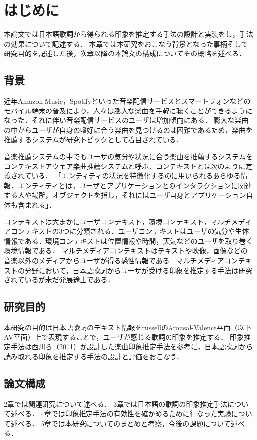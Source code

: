 \documentclass[a4paper,11pt,oneside,openany]{jsbook}
\begin{document}
\chapter{はじめに}
本論文では日本語歌詞から得られる印象を推定する手法の設計と実装をし，手法の効果について記述する．
本章では本研究をおこなう背景となった事柄そして研究目的を記述した後，次章以降の本論文の構成についてその概略を述べる．

\section{背景}
近年Amazon Music，Spotifyといった音楽配信サービスとスマートフォンなどのモバイル端末の普及により，人々は膨大な楽曲を手軽に聴くことができるようになった．それに伴い音楽配信サービスのユーザは増加傾向にある\cite{1}．
膨大な楽曲の中からユーザが自身の嗜好に合う楽曲を見つけるのは困難であるため，楽曲を推薦するシステムが研究トピックとして着目されている．

音楽推薦システムの中でもユーザの気分や状況に合う楽曲を推薦するシステムをコンテキストアウェア楽曲推薦システムと呼ぶ．コンテキストとは次のように定義されている．
「エンティティの状況を特徴化するのに用いられるあらゆる情報．エンティティとは，ユーザとアプリケーションとのインタラクションに関連する人や場所，オブジェクトを指し，それにはユーザ自身とアプリケーション自体も含まれる」\cite{2}．

コンテキストは大まかにユーザコンテキスト，環境コンテキスト，マルチメディアコンテキストの3つに分類される．ユーザコンテキストはユーザの気分や生体情報である．環境コンテキストは位置情報や時間，天気などのユーザを取り巻く環境情報である．
マルチメディアコンテキストはテキストや映像，画像などの音楽以外のメディアからユーザが得る感性情報である．マルチメディアコンテキストの分野において，日本語歌詞からユーザが受ける印象を推定する手法は研究されているが未だ発展途上である．
\section{研究目的}
本研究の目的は日本語歌詞のテキスト情報をrussellのArousal-Valence平面\cite{3}（以下AV平面）上で表現することで，ユーザが感じる歌詞の印象を推定する．
印象推定手法は西川ら（2011）\cite{4}が設計した楽曲印象推定手法を参考に，日本語歌詞から読み取れる印象を推定する手法の設計と評価をおこなう．

\section{論文構成}
2章では関連研究について述べる．
3章では日本語の歌詞の印象推定手法について述べる．
4章では印象推定手法の有効性を確かめるために行なった実験について述べる．
5章では本研究についてのまとめと考察，今後の課題について述べる．

%
\end{document}
